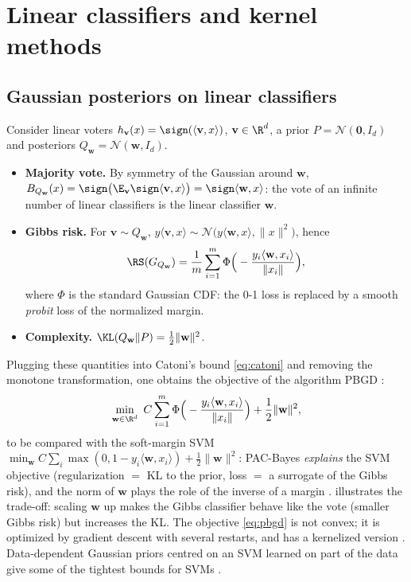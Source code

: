 \section{Linear classifiers and kernel methods}

\subsection{Gaussian posteriors on linear classifiers}

Consider linear voters $h_{\mathbf v}(x)=\sign(\langle\mathbf v,x\rangle)$,
$\mathbf v\in\R^d$, a prior $P=\mathcal N(\mathbf 0,I_d)$ and posteriors
$Q_{\mathbf w}=\mathcal N(\mathbf w,I_d)$.
\begin{itemize}
\item \textbf{Majority vote.} By symmetry of the Gaussian around $\mathbf w$,
      $B_{Q_{\mathbf w}}(x)=\sign\big(\E_{\mathbf v}\sign\langle\mathbf v,x\rangle\big)=\sign\langle\mathbf w,x\rangle$:
      the vote of an infinite number of linear classifiers is the linear
      classifier $\mathbf w$.
\item \textbf{Gibbs risk.} For $\mathbf v\sim Q_{\mathbf w}$,
      $y\langle\mathbf v,x\rangle\sim\mathcal N\big(y\langle\mathbf w,x\rangle,\|x\|^2\big)$, hence
      \begin{equation}\label{eq:probit}
      \RS(G_{Q_{\mathbf w}})=\frac1m\sum_{i=1}^m\Phi\Big(-\frac{y_i\langle\mathbf w,x_i\rangle}{\|x_i\|}\Big),
      \end{equation}
      where $\Phi$ is the standard Gaussian CDF: the 0-1 loss is replaced by
      a smooth \emph{probit} loss of the normalized margin.
\item \textbf{Complexity.} $\KL(Q_{\mathbf w}\|P)=\frac12\|\mathbf w\|^2$.
\end{itemize}
Plugging these quantities into Catoni's bound \eqref{eq:catoni} and removing
the monotone transformation, one obtains the objective of the algorithm
PBGD \citep{germain2009pac}:
\begin{equation}\label{eq:pbgd}
\min_{\mathbf w\in\R^d}\ C\sum_{i=1}^m\Phi\Big(-\frac{y_i\langle\mathbf w,x_i\rangle}{\|x_i\|}\Big)+\frac12\|\mathbf w\|^2,
\end{equation}
to be compared with the soft-margin SVM $\min_{\mathbf w}C\sum_i\max(0,1-y_i\langle\mathbf w,x_i\rangle)+\frac12\|\mathbf w\|^2$:
PAC-Bayes \emph{explains} the SVM objective (regularization $=$ KL to the
prior, loss $=$ a surrogate of the Gibbs risk), and the norm of $\mathbf w$
plays the role of the inverse of a margin \citep{langford2002pac,mcallester2003simplified}.
 illustrates the trade-off: scaling $\mathbf w$ up makes the
Gibbs classifier behave like the vote (smaller Gibbs risk) but increases the KL.
The objective \eqref{eq:pbgd} is not convex; it is optimized by gradient
descent with several restarts, and has a kernelized version
\citep{germain2009pac}. Data-dependent Gaussian priors centred on an SVM
learned on part of the data give some of the tightest bounds for SVMs
\citep{ambroladze2006tighter,parrado2012pac}.

